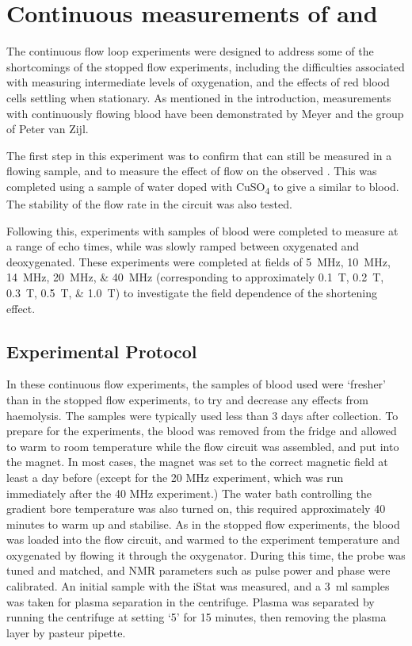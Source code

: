 \chapter{Continuous measurements of \Ttwo and \SOtwo}
\label{ch:cont}
The continuous flow loop experiments were designed to address some of the shortcomings of the stopped flow experiments, including the difficulties associated with measuring intermediate levels of oxygenation, and the effects of red blood cells settling when stationary.
As mentioned in the introduction, measurements with continuously flowing blood have been demonstrated by Meyer\cite{MeyerNMRrelaxationrates1995} and the group of Peter van Zijl\cite{ZhaoOxygenationhematocritdependence2007,QinDeterminationwholebrainoxygen2011,GrgacTransversewaterrelaxation2017}.

The first step in this experiment was to confirm that \Ttwo can still be measured in a flowing sample, and to measure the effect of flow on the observed \Ttwo.
This was completed using a sample of water doped with CuSO\textsubscript{4} to give a \Ttwo similar to blood.
The stability of the flow rate in the circuit was also tested.

Following this, experiments with samples of blood were completed to measure \Ttwo at a range of echo times, while \SOtwo was slowly ramped between oxygenated and deoxygenated.
These experiments were completed at fields of \SIlist{5;10;14;20;40}{MHz} (corresponding to approximately \SIlist{0.1;0.2;0.3;0.5;1.0}{T}) to investigate the field dependence of the \Ttwo shortening effect.

\section{Experimental Protocol}

In these continuous flow experiments, the samples of blood used were `fresher' than in the stopped flow experiments, to try and decrease any effects from haemolysis.
The samples were typically used less than 3 days after collection.
To prepare for the experiments, the blood was removed from the fridge and allowed to warm to room temperature while the flow circuit was assembled, and put into the magnet.
In most cases, the magnet was set to the correct magnetic field at least a day before (except for the 20 MHz experiment, which was run immediately after the 40 MHz experiment.)
The water bath controlling the gradient bore temperature was also turned on, this required approximately 40 minutes to warm up and stabilise.
As in the stopped flow experiments, the blood was loaded into the flow circuit, and warmed to the experiment temperature and oxygenated by flowing it through the oxygenator.
During this time, the probe was tuned and matched, and NMR parameters such as pulse power and phase were calibrated.
An initial sample with the iStat was measured, and a \SI{3}{ml} samples was taken for plasma separation in the centrifuge.
Plasma was separated by running the centrifuge at setting `5' for 15 minutes, then removing the plasma layer by pasteur pipette.

